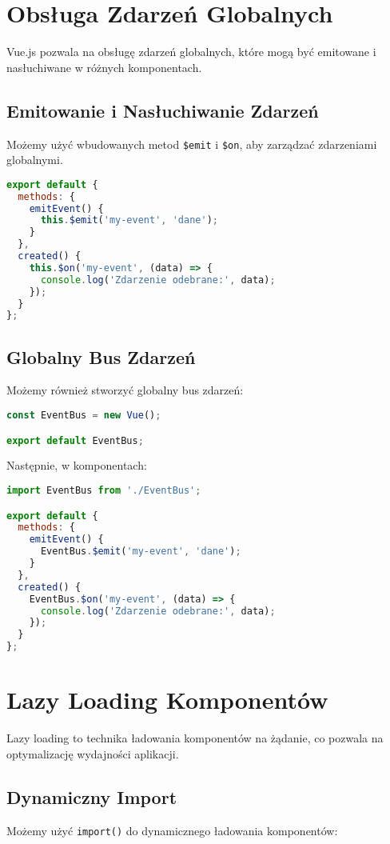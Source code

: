 \documentclass[a4paper,12pt]{article}
\begin{document}
\section{Obsługa Zdarzeń Globalnych}
Vue.js pozwala na obsługę zdarzeń globalnych, które mogą być emitowane i nasłuchiwane w różnych komponentach.

\subsection{Emitowanie i Nasłuchiwanie Zdarzeń}
Możemy użyć wbudowanych metod \texttt{\$emit} i \texttt{\$on}, aby zarządzać zdarzeniami globalnymi.

\begin{lstlisting}[language=JavaScript]
export default {
  methods: {
    emitEvent() {
      this.$emit('my-event', 'dane');
    }
  },
  created() {
    this.$on('my-event', (data) => {
      console.log('Zdarzenie odebrane:', data);
    });
  }
};
\end{lstlisting}

\subsection{Globalny Bus Zdarzeń}
Możemy również stworzyć globalny bus zdarzeń:

\begin{lstlisting}[language=JavaScript]
const EventBus = new Vue();

export default EventBus;
\end{lstlisting}

Następnie, w komponentach:

\begin{lstlisting}[language=JavaScript]
import EventBus from './EventBus';

export default {
  methods: {
    emitEvent() {
      EventBus.$emit('my-event', 'dane');
    }
  },
  created() {
    EventBus.$on('my-event', (data) => {
      console.log('Zdarzenie odebrane:', data);
    });
  }
};
\end{lstlisting}

\section{Lazy Loading Komponentów}
Lazy loading to technika ładowania komponentów na żądanie, co pozwala na optymalizację wydajności aplikacji.

\subsection{Dynamiczny Import}
Możemy użyć \texttt{import()} do dynamicznego ładowania komponentów:
\end{document}
